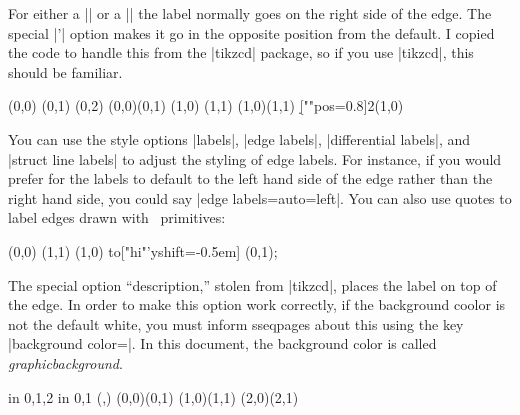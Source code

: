 \documentclass{ltxdoc}
\newenvironment{manualentry}[1]{
    \begin{pgfmanualentry}
    \pgfmanualentryheadline{#1}
    \pgfmanualbody
}{
    \end{pgfmanualentry}
}
\begin{document}
\begin{sseqdata}[name=ex1,degree={#1}{1-#1}]
\begin{manualentry}{\pgfmanualpdflabel{""quotes}{}|"|\meta{text}|"|\opt{\meta{options}}}
For either a |\structline| or a |\class| the label normally goes on the right side of the edge. The special |'| option makes it go in the opposite position from the default. I copied the code to handle this from the |tikzcd| package, so if you use |tikzcd|, this should be familiar.
\begin{codeexample}[]
\begin{sseqpage}
\class(0,0)
\class(0,1)
\class(0,2)
\structline["a"' blue](0,0)(0,1)
\class(1,0)
\class(1,1)
\structline["b"](1,0)(1,1)
\d[""{pos=0.8}]2(1,0)
\end{sseqpage}
\end{codeexample}
You can use the style options |labels|, |edge labels|, |differential labels|, and |struct line labels| to adjust the styling of edge labels. For instance, if you would prefer for the labels to default to the left hand side of the edge rather than the right hand side, you could say |edge labels={auto=left}|.
You can also use quotes to label edges drawn with \tikzname\ primitives:
\begin{codeexample}[]
\begin{sseqpage}
\class(0,0) \class(1,1)
\draw (1,0) to["hi"'{yshift=-0.5em}] (0,1);
\end{sseqpage}
\end{codeexample}
The special option ``description,'' stolen from |tikzcd|, places the label on top of the edge. In order to make this option work correctly, if the background coolor is not the default white, you must inform sseqpages about this using the key |background color=|. In this document, the background color is called \textit{graphicbackground}.
\begin{codeexample}[]
\begin{sseqpage}[no axes,background color=graphicbackground]
\foreach\x in {0,1,2} \foreach\y in {0,1}{
    \class(\x,\y)
}
\structline["a" red](0,0)(0,1)
\structline["a'"'blue,"b"{yshift=1em}](1,0)(1,1)
\structline["c" description](2,0)(2,1)
\end{sseqpage}
\end{codeexample}
\end{manualentry}




\end{sseqdata}
\end{document}
